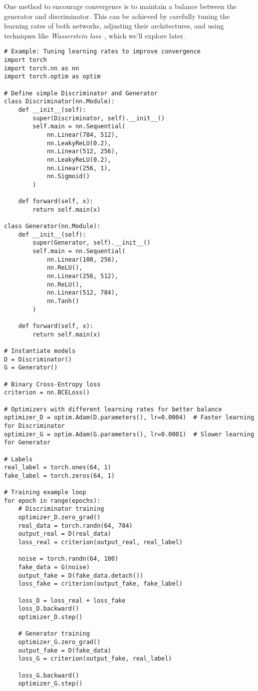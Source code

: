 One method to encourage convergence is to maintain a balance between the generator and discriminator. This can be achieved by carefully tuning the learning rates of both networks, adjusting their architectures, and using techniques like \textit{Wasserstein loss}~\cite{frogner2015learning}, which we'll explore later.

\begin{lstlisting}[style=python]
# Example: Tuning learning rates to improve convergence
import torch
import torch.nn as nn
import torch.optim as optim

# Define simple Discriminator and Generator
class Discriminator(nn.Module):
    def __init__(self):
        super(Discriminator, self).__init__()
        self.main = nn.Sequential(
            nn.Linear(784, 512),
            nn.LeakyReLU(0.2),
            nn.Linear(512, 256),
            nn.LeakyReLU(0.2),
            nn.Linear(256, 1),
            nn.Sigmoid()
        )

    def forward(self, x):
        return self.main(x)

class Generator(nn.Module):
    def __init__(self):
        super(Generator, self).__init__()
        self.main = nn.Sequential(
            nn.Linear(100, 256),
            nn.ReLU(),
            nn.Linear(256, 512),
            nn.ReLU(),
            nn.Linear(512, 784),
            nn.Tanh()
        )

    def forward(self, x):
        return self.main(x)

# Instantiate models
D = Discriminator()
G = Generator()

# Binary Cross-Entropy loss
criterion = nn.BCELoss()

# Optimizers with different learning rates for better balance
optimizer_D = optim.Adam(D.parameters(), lr=0.0004)  # Faster learning for Discriminator
optimizer_G = optim.Adam(G.parameters(), lr=0.0001)  # Slower learning for Generator

# Labels
real_label = torch.ones(64, 1)
fake_label = torch.zeros(64, 1)

# Training example loop
for epoch in range(epochs):
    # Discriminator training
    optimizer_D.zero_grad()
    real_data = torch.randn(64, 784)
    output_real = D(real_data)
    loss_real = criterion(output_real, real_label)
    
    noise = torch.randn(64, 100)
    fake_data = G(noise)
    output_fake = D(fake_data.detach())
    loss_fake = criterion(output_fake, fake_label)
    
    loss_D = loss_real + loss_fake
    loss_D.backward()
    optimizer_D.step()
    
    # Generator training
    optimizer_G.zero_grad()
    output_fake = D(fake_data)
    loss_G = criterion(output_fake, real_label)
    
    loss_G.backward()
    optimizer_G.step()
\end{lstlisting}

